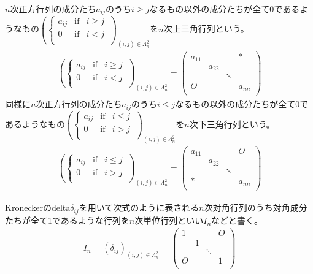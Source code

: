 \documentclass[dvipdfmx]{jsarticle}
\begin{document}
\begin{dfn}
$n$次正方行列の成分たち$a_{ij}$のうち$i \geq j$なるもの以外の成分たちが全て0であるようなもの$\left( \left\{ \begin{matrix}
a_{ij} & \mathrm{if} & i \geq j \\
0 & \mathrm{if} & i < j \\
\end{matrix} \right.\  \right)_{(i,j) \in \varLambda_{n}^{2}}$を$n$次上三角行列という。
\begin{align*}
\left( \left\{ \begin{matrix}
a_{ij} & \mathrm{if} & i \geq j \\
0 & \mathrm{if} & i < j \\
\end{matrix} \right.\  \right)_{(i,j) \in \varLambda_{n}^{2}} = \begin{pmatrix}
a_{11} & \  & \  & * \\
\  & a_{22} & \  & \  \\
\  & \  & \ddots & \  \\
O & \  & \  & a_{nn} \\
\end{pmatrix}
\end{align*}
同様に$n$次正方行列の成分たち$a_{ij}$のうち$i \leq j$なるもの以外の成分たちが全て0であるようなもの$\left( \left\{ \begin{matrix}
a_{ij} & \mathrm{if} & i \leq j \\
0 & \mathrm{if} & i > j \\
\end{matrix} \right.\  \right)_{(i,j) \in \varLambda_{n}^{2}}$を$n$次下三角行列という。
\begin{align*}
\left( \left\{ \begin{matrix}
a_{ij} & \mathrm{if} & i \leq j \\
0 & \mathrm{if} & i > j \\
\end{matrix} \right.\  \right)_{(i,j) \in \varLambda_{n}^{2}} = \begin{pmatrix}
a_{11} & \  & \  & O \\
\  & a_{22} & \  & \  \\
\  & \  & \ddots & \  \\
* & \  & \  & a_{nn} \\
\end{pmatrix}
\end{align*}
\end{dfn}
\begin{dfn}
Kroneckerのdelta$\delta_{ij}$を用いて次式のように表される$n$次対角行列のうち対角成分たちが全て1であるような行列を$n$次単位行列といい$I_{n}$などと書く。
\begin{align*}
I_{n} = \left( \delta_{ij} \right)_{(i,j) \in \varLambda_{n}^{2}} = \begin{pmatrix}
1 & \  & \  & O \\
\  & 1 & \  & \  \\
\  & \  & \ddots & \  \\
O & \  & \  & 1 \\
\end{pmatrix}
\end{align*}
\end{dfn}
\end{document}
